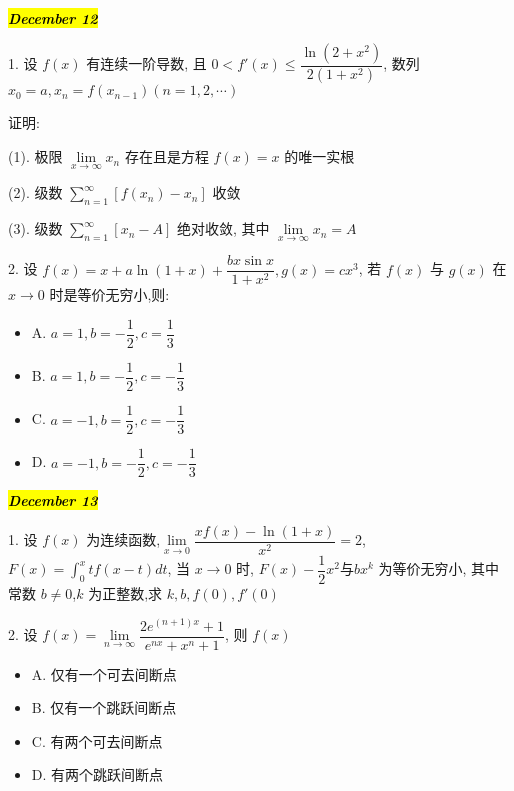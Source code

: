 \hl{\textbf{\textit{December 12}}}

1. 设 $f(x)$ 有连续一阶导数, 且 $0<f'(x)\leq\dfrac{\ln(2+x^{2})}{2(1+x^{2})}$, 数列 $x_{0}=a,x_{n}=f(x_{n-1})(n=1,2,\cdots )$

证明:

(1). 极限 $\lim\limits_{x\rightarrow \infty}x_{n}$ 存在且是方程 $f(x)=x$ 的唯一实根 

(2). 级数 $\sum\limits_{n=1}^{\infty}\left[f(x_{n})-x_{n}\right]$ 收敛

(3). 级数 $\sum\limits_{n=1}^{\infty}\left[x_{n}-A\right]$ 绝对收敛, 其中 $\lim\limits_{x\rightarrow\infty}x_{n}=A$
\begin{solution}
	
\end{solution}

2. 设 $f(x)=x+a\ln(1+x)+\dfrac{bx\sin x}{1+x^{2}},g(x)=cx^{3}$, 若 $f(x)$ 与 $g(x)$ 在 $x\to 0$ 时是等价无穷小,则:
\begin{itemize}
	\item A. $a=1,b=-\dfrac{1}{2},c=\dfrac{1}{3}$ 
	\item B. $a=1,b=-\dfrac{1}{2},c=-\dfrac{1}{3}$
	\item C. $a=-1,b=\dfrac{1}{2},c=-\dfrac{1}{3}$
	\item D. $a=-1,b=-\dfrac{1}{2},c=-\dfrac{1}{3}$
\end{itemize}
\begin{solution}
	
\end{solution}

\hl{\textbf{\textit{December 13}}}

1. 设 $f(x)$ 为连续函数,$\lim\limits_{x\rightarrow 0}\dfrac{xf(x)-\ln(1+x)}{x^{2}}=2$,$F(x)=\int_{0}^{x}tf(x-t)dt$, 当 $x\to 0$ 时,
$F(x)-\dfrac{1}{2}x^{2}$与$bx^{k}$ 为等价无穷小, 其中常数 $b\neq 0$,$k$ 为正整数,求 $k,b,f(0),f'(0)$
\begin{solution}
	
\end{solution}

2. 设 $f(x)=\lim\limits_{n\rightarrow\infty}\dfrac{2e^{(n+1)x}+1}{e^{nx}+x^{n}+1}$, 则 $f(x)$
\begin{itemize}
	\item A. 仅有一个可去间断点 
	\item B. 仅有一个跳跃间断点
	\item C. 有两个可去间断点
	\item D. 有两个跳跃间断点
\end{itemize}
\begin{solution}
	
\end{solution}

